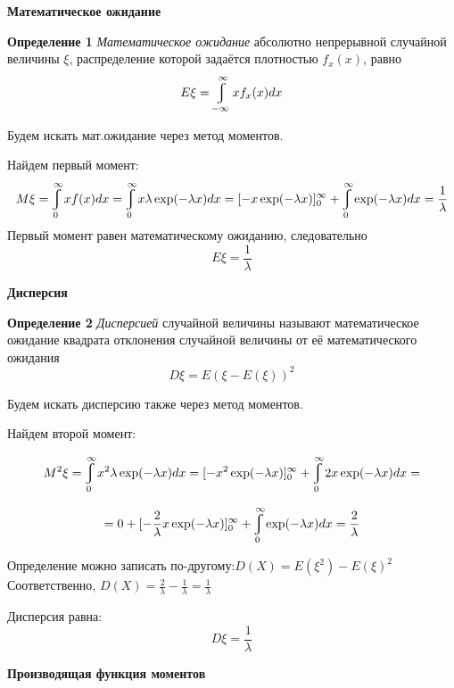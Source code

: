 \documentclass[a4paper,12pt, oneside]{book}
\let\int\varint
\begin{document}
	
	
	
	\vspace{5mm}
	\large{\textbf{Математическое ожидание}}
	\vspace{5mm}
	
	\normalsize{\textbf{Определение 1}} \textit{ Математическое ожидание} абсолютно непрерывной случайной величины $\xi$, распределение которой задаётся плотностью $f_x(x)$, равно
	$$
	E\xi = \int\limits_{-\infty}^{\infty} x f_x(x)dx
	$$
	
	Будем искать мат.ожидание через метод моментов.
	
	\vspace{\baselineskip}
	Найдем первый момент:
	$$
	M\xi = \int_0^\infty x f(x) dx = \int_0^\infty x \lambda \exp(-\lambda x)dx = [- x \exp(- \lambda x)]_0^\infty + \int_0^\infty \exp(-\lambda x) dx = \frac{1}{\lambda}
	$$
	Первый момент равен математическому  ожиданию, следовательно 
	$$
	 E\xi = \frac{1}{\lambda}
	$$	
	
	\vspace{5mm}
	\large{\textbf{Дисперсия}}
	\vspace{5mm}
	
	\normalsize{\textbf{Определение 2}} \textit{ Дисперсией } случайной величины называют математическое ожидание квадрата отклонения случайной величины от её математического ожидания
	$$
	D\xi = E(\xi - E(\xi))^2
	$$
	
	\vspace{\baselineskip}
	Будем искать дисперсию также через метод моментов.
	
	Найдем второй момент:
	
	$$
	M^2\xi = \int_0^\infty x^2 \lambda \exp(-\lambda x) dx = [-x^2 \exp(-\lambda x)]_0^\infty +\int_0^\infty 2 x \exp(-\lambda x)dx =
	$$ 
	
	$$
	= 0 + [-\frac{2}{\lambda} x \exp(-\lambda x)]_0^\infty + \int_0^\infty \exp(-\lambda x)dx = \frac{2}{\lambda}
	$$
	
	\vspace{\baselineskip}
	Определение можно записать по-другому:$D(X) = E(\xi^2) - E(\xi)^2$\\
	
	
	Соответственно, $D(X) = \frac{2}{\lambda} - \frac{1}{\lambda} = \frac{1}{\lambda}$ 
	\vspace{\baselineskip}
	
	Дисперсия равна:
	$$
	D\xi =  \frac{1}{\lambda}
	$$
	
	
	\vspace{5mm}
	\large{\textbf{Производящая функция моментов}}
	\vspace{5mm}
	
\end{document}
